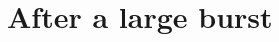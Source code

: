 \documentclass[11pt]{memoir}
\theoremstyle{definition} %
\newcommand{\passno}{\pi}
\begin{document}







\section{After a large burst}
\end{document}

